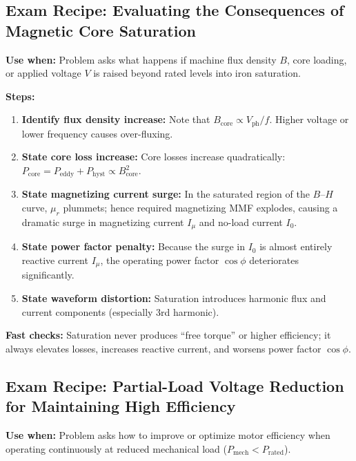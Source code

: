 \subsection{Exam Recipe: Evaluating the Consequences of Magnetic Core Saturation}
\textbf{Use when:} Problem asks what happens if machine flux density $B$, core loading, or applied voltage $V$ is raised beyond rated levels into iron saturation.

\textbf{Steps:}
\begin{enumerate}
  \item \textbf{Identify flux density increase:} Note that $B_{\mathrm{core}} \propto V_{\mathrm{ph}}/f$. Higher voltage or lower frequency causes over-fluxing.
  \item \textbf{State core loss increase:} Core losses increase quadratically: $P_{\mathrm{core}} = P_{\mathrm{eddy}} + P_{\mathrm{hyst}} \propto B_{\mathrm{core}}^2$.
  \item \textbf{State magnetizing current surge:} In the saturated region of the $B$--$H$ curve, $\mu_r$ plummets; hence required magnetizing MMF explodes, causing a dramatic surge in magnetizing current $I_\mu$ and no-load current $I_0$.
  \item \textbf{State power factor penalty:} Because the surge in $I_0$ is almost entirely reactive current $I_\mu$, the operating power factor $\cos\phi$ deteriorates significantly.
  \item \textbf{State waveform distortion:} Saturation introduces harmonic flux and current components (especially 3rd harmonic).
\end{enumerate}

\textbf{Fast checks:} Saturation never produces ``free torque'' or higher efficiency; it always elevates losses, increases reactive current, and worsens power factor $\cos\phi$.

\subsection{Exam Recipe: Partial-Load Voltage Reduction for Maintaining High Efficiency}
\textbf{Use when:} Problem asks how to improve or optimize motor efficiency when operating continuously at reduced mechanical load ($P_{\mathrm{mech}} < P_{\mathrm{rated}}$).

